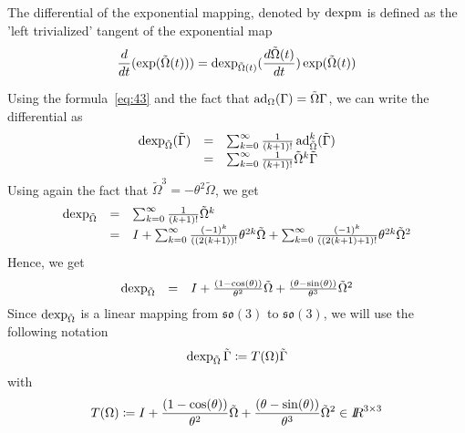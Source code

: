 
The differential of the exponential mapping, denoted by $\operatorname{dexpm}$ is defined as the 'left trivialized' tangent of the exponential map
\begin{equation}
  \label{eq:72}
   \frac{d}{dt} (\exp(\tilde \Omega(t))) = \operatorname{dexp}_{\tilde\Omega(t)}(\frac{d \tilde{\Omega}(t)}{dt}) \exp(\tilde\Omega(t))
\end{equation}

Using the formula~\eqref{eq:43} and the fact that $\operatorname{ad}_\Omega(\Gamma) = \Tilde\Omega \Gamma$, we can write the differential as
\begin{equation}
  \label{eq:122}
  \begin{array}{lcl}
    \operatorname{dexp}_{\tilde\Omega}(\tilde\Gamma) &=& \sum_{k=0}^\infty \frac{1}{(k+1)!} \operatorname{ad}_{\tilde \Omega}^k (\tilde\Gamma) \\
                                       &=& \sum_{k=0}^\infty \frac{1}{(k+1)!} \tilde\Omega^k \tilde \Gamma \\
  \end{array}
\end{equation}
Using again the fact that $\tilde\Omega^3 = -\theta^2 \tilde\Omega$, we get
\begin{equation}
  \label{eq:123}
   \begin{array}{lcl}
     \operatorname{dexp}_{\tilde\Omega} &=& \sum_{k=0}^\infty  \frac{1}{(k+1)!} \tilde\Omega^k \\
                          &=& I  + \sum_{k=0}^\infty  \frac{(-1)^k}{((2(k+1))!} \theta^{2k} \tilde\Omega + \sum_{k=0}^\infty  \frac{(-1)^k}{((2(k+1)+1)!} \theta^{2k} \tilde\Omega^2\\
  \end{array}
\end{equation}
Hence, we get
\begin{equation}
  \label{eq:124}
   \begin{array}{lcl}
     \operatorname{dexp}_{\tilde\Omega}  &=& I  + \frac{(1-\cos(\theta))}{\theta^2}\tilde\Omega + \frac{(\theta-\sin(\theta))}{\theta^3}\tilde\Omega^2
  \end{array}
\end{equation}
Since $\operatorname{dexp}_{\tilde\Omega}$ is a linear mapping from $\mathfrak{so(3)}$ to $\mathfrak{so(3)}$, we will use the following notation
\begin{equation}
  \label{eq:172}
  \operatorname{dexp}_{\tilde\Omega}\tilde\Gamma  \coloneqq T(\Omega)\tilde\Gamma
\end{equation}
with
\begin{equation}
  \label{eq:173}
   T(\Omega) \coloneqq I  + \frac{(1-\cos(\theta))}{\theta^2}\tilde\Omega + \frac{(\theta-\sin(\theta))}{\theta^3}\tilde\Omega^2  \in \mbox{\rm $I\!\!R$}^{3\times 3}
\end{equation}




